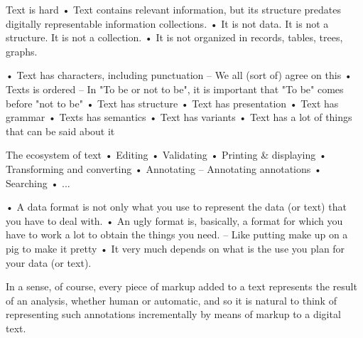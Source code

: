 Text is hard
• Text contains relevant information, but its
structure predates digitally representable
information collections.
• It is not data. It is not a structure. It is not a
collection.
• It is not organized in records, tables, trees,
graphs. 

• Text has characters, including punctuation
– We all (sort of) agree on this
• Texts is ordered
– In "To be or not to be", it is important that "To be"
comes before "not to be"
• Text has structure
• Text has presentation
• Text has grammar
• Texts has semantics
• Text has variants
• Text has a lot of things that can be said about it 



The ecosystem of text
• Editing
• Validating
• Printing & displaying
• Transforming and converting
• Annotating
– Annotating annotations
• Searching
• ... 

• A data format is not only what you use to
represent the data (or text) that you have to
deal with.
• An ugly format is, basically, a format for which
you have to work a lot to obtain the things you
need.
– Like putting make up on a pig to make it pretty
• It very much depends on what is the use you
plan for your data (or text). 

In a sense, of course, every piece of markup added to a text represents the result of an analysis, whether human or automatic, and so it is natural to think of representing such annotations incrementally by means of markup to a digital text.